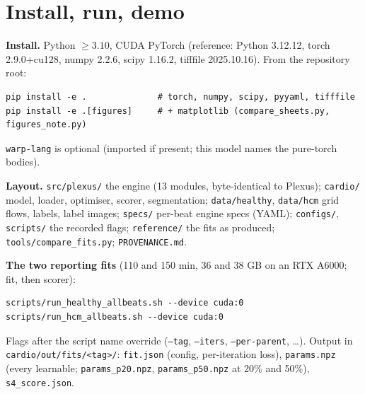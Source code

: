 \documentclass[10pt]{article}
\newcommand{\code}[1]{\texttt{#1}}
\begin{document}
\clearpage
\section{Install, run, demo}\label{sec:run}

\textbf{Install.} Python $\ge 3.10$, CUDA PyTorch (reference: Python 3.12.12, torch 2.9.0+cu128, numpy
2.2.6, scipy 1.16.2, tifffile 2025.10.16). From the repository root:
\begin{lstlisting}[style=sh]
pip install -e .              # torch, numpy, scipy, pyyaml, tifffile
pip install -e .[figures]     # + matplotlib (compare_sheets.py, figures_note.py)
\end{lstlisting}
\code{warp-lang} is optional (imported if present; this model names the pure-torch bodies).

\textbf{Layout.} \code{src/plexus/} the engine (13 modules, byte-identical to Plexus); \code{cardio/}
model, loader, optimiser, scorer, segmentation; \code{data/healthy}, \code{data/hcm} grid flows, labels,
label images; \code{specs/} per-beat engine specs (YAML); \code{configs/}, \code{scripts/} the recorded
flags; \code{reference/} the fits as produced; \code{tools/compare\_fits.py}; \code{PROVENANCE.md}.

\textbf{The two reporting fits} (110 and 150 min, 36 and 38 GB on an RTX A6000; fit, then scorer):
\begin{lstlisting}[style=sh]
scripts/run_healthy_allbeats.sh --device cuda:0
scripts/run_hcm_allbeats.sh --device cuda:0
\end{lstlisting}
Flags after the script name override (\code{--tag}, \code{--iters}, \code{--per-parent}, \ldots). Output in
\code{cardio/out/fits/<tag>/}: \code{fit.json} (config, per-iteration loss), \code{params.npz} (every
learnable; \code{params\_p20.npz}, \code{params\_p50.npz} at 20\% and 50\%), \code{s4\_score.json}.
\end{document}
